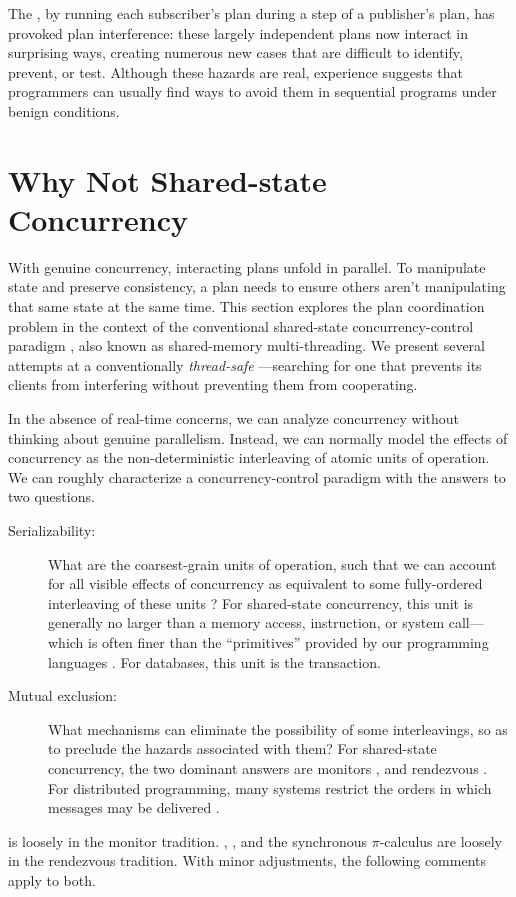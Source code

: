 \documentclass{llncs}
\begin{document}
The , by running each subscriber's plan during a
step of a publisher's plan, has provoked plan interference: these
largely independent plans now interact in surprising ways, creating
numerous new cases that are difficult to identify, prevent, or
test. Although these hazards are real, experience suggests that
programmers can usually find ways to avoid them in sequential programs
under benign conditions.

\section{Why Not Shared-state Concurrency}

With genuine concurrency, interacting plans unfold in parallel. To
manipulate state and preserve consistency, a plan needs to ensure
others aren't manipulating that same state at the same time. This
section explores the plan coordination problem in the context of the
conventional shared-state concurrency-control paradigm
\cite{VanRoyHaridi}, also known as shared-memory multi-threading. We
present several attempts at a conventionally \emph{thread-safe}
---searching for one that prevents its clients from
interfering without preventing them from
cooperating.

In the absence of real-time concerns, we can analyze concurrency
without thinking about genuine parallelism. Instead, we can normally
model the effects of concurrency as the non-deterministic interleaving
of atomic units of operation. We can roughly characterize a
concurrency-control paradigm with the answers to two questions.
%
\begin{description}

\item[Serializability:] 

What are the coarsest-grain units of operation, such that we can
account for all visible effects of concurrency as equivalent to some
fully-ordered interleaving of these units \cite{IBM:POO}? For
shared-state concurrency, this unit is generally no larger than a
memory access, instruction, or system call---which is often finer than
the ``primitives'' provided by our programming languages
\cite{boehm:threads}. For databases, this unit is the transaction.

\item[Mutual exclusion:]

What mechanisms can eliminate the possibility of some interleavings,
so as to preclude the hazards associated with them? For shared-state
concurrency, the two dominant answers are monitors
\cite{hoare:monitors,hansen:monitors}, and rendezvous
\cite{hoare:csp}. For distributed programming, many systems restrict
the orders in which messages may be delivered
\cite{birman:vsync,amir:thesis,lamport:paxos}.

\end{description}
%
 is loosely in the monitor tradition. ,
, and the synchronous $\pi$-calculus are loosely in
the rendezvous tradition. With minor adjustments, the following
comments apply to both.
\end{document}
